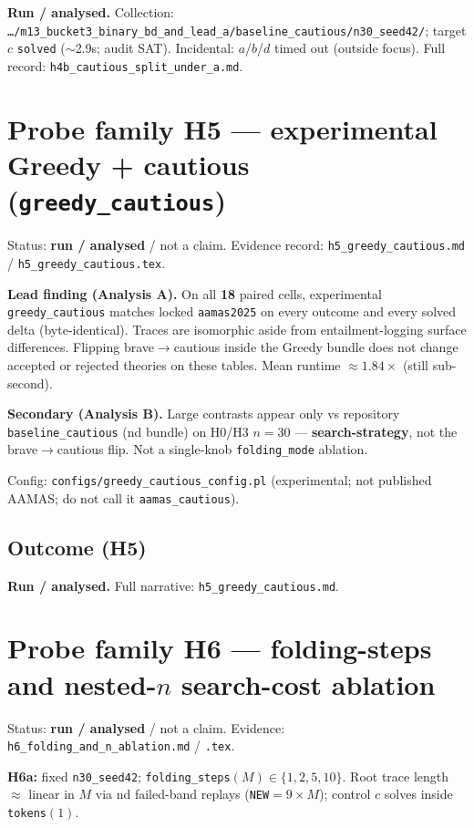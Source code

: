 \documentclass[11pt]{article}
\begin{document}
\textbf{Run / analysed.}
Collection:
\texttt{\ldots/m13\_bucket3\_binary\_bd\_and\_lead\_a/baseline\_cautious/n30\_seed42/};
target \(c\) \texttt{solved} ($\sim$2.9s; audit SAT).
Incidental: \(a\)/\(b\)/\(d\) timed out (outside focus).
Full record: \texttt{h4b\_cautious\_split\_under\_a.md}.

\section{Probe family H5 --- experimental Greedy + cautious
(\texttt{greedy\_cautious})}

Status: \textbf{run / analysed} / not a claim.
Evidence record: \texttt{h5\_greedy\_cautious.md} /
\texttt{h5\_greedy\_cautious.tex}.

\textbf{Lead finding (Analysis A).}
On all \textbf{18} paired cells, experimental \texttt{greedy\_cautious}
matches locked \texttt{aamas2025} on every outcome and every solved delta
(byte-identical).
Traces are isomorphic aside from entailment-logging surface differences.
Flipping brave$\to$cautious inside the Greedy bundle does not change
accepted or rejected theories on these tables.
Mean runtime $\approx 1.84\times$ (still sub-second).

\textbf{Secondary (Analysis B).}
Large contrasts appear only vs repository \texttt{baseline\_cautious}
(nd bundle) on H0/H3 $n{=}30$ --- \textbf{search-strategy}, not the
brave$\to$cautious flip.
Not a single-knob \texttt{folding\_mode} ablation.

Config: \texttt{configs/greedy\_cautious\_config.pl} (experimental; not
published AAMAS; do not call it \texttt{aamas\_cautious}).

\subsection{Outcome (H5)}

\textbf{Run / analysed.}
Full narrative: \texttt{h5\_greedy\_cautious.md}.

\section{Probe family H6 --- folding-steps and nested-$n$ search-cost ablation}

Status: \textbf{run / analysed} / not a claim.
Evidence: \texttt{h6\_folding\_and\_n\_ablation.md} / \texttt{.tex}.

\textbf{H6a:} fixed \texttt{n30\_seed42}; \texttt{folding\_steps}$(M)\in\{1,2,5,10\}$.
Root trace length $\approx$ linear in $M$ via nd failed-band replays
(\texttt{NEW}${}={}9\times M$); control $c$ solves inside \texttt{tokens}$(1)$.
\end{document}
